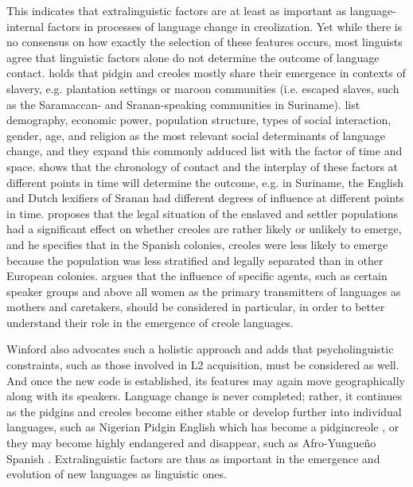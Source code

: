 \documentclass[output=paper]{langscibook}
\begin{document}
This indicates that extralinguistic factors are at least as important as language-internal factors in processes of language change in creolization. Yet while there is no consensus on how exactly the selection of these features occurs, most linguists agree that linguistic factors alone do not determine the outcome of language contact. \citet{meshtrie2017slavery} holds that pidgin and creoles mostly share their emergence in contexts of slavery, e.g. plantation settings or maroon communities (i.e. escaped slaves, such as the Saramaccan- and Sranan-speaking communities in Suriname). \citet{mufweneetal2017} list demography, economic power, population structure, types of social interaction, gender, age, and religion as the most relevant social determinants of language change, and they expand this commonly adduced list with the factor of time and space. \citet{arends2017language} shows that the chronology of contact and the interplay of these factors at different points in time will determine the outcome, e.g. in Suriname, the English and Dutch lexifiers of Sranan had different degrees of influence at different points in time. \citet{sessarego2017legal} proposes that the legal situation of the enslaved and settler populations had a significant effect on whether creoles are rather likely or unlikely to emerge, and he specifies that in the Spanish colonies, creoles were less likely to emerge because the population was less stratified and legally separated than in other European colonies. \citet{faraclas2012women} argues that the influence of specific agents, such as certain speaker groups and above all women as the primary transmitters of languages as mothers and caretakers, should be considered in particular, in order to better understand their role in the emergence of creole languages.

Winford \citep[cited in][]{baptista2017competition} also advocates such a holistic approach and adds that psycholinguistic constraints, such as those involved in L2 acquisition, must be considered as well. And once the new code is established, its features may again move geographically along with its speakers. Language change is never completed; rather, it continues as the pidgins and creoles become either stable or develop further into individual languages, such as Nigerian Pidgin English which has become a pidgincreole \citep[cf.][]{bakker2008pidgins}, or they may become highly endangered and disappear, such as Afro-Yungueño Spanish \citep{perez2015traces}. Extralinguistic factors are thus as important in the emergence and evolution of new languages as linguistic ones.
\end{document}
